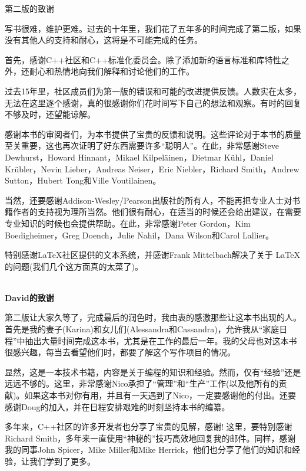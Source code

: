 \begin{flushright}
 第二版的致谢
\end{flushright}

写书很难，维护更难。过去的十年里，我们花了五年多的时间完成了第二版，如果没有其他人的支持和耐心，这将是不可能完成的任务。

首先，感谢C++社区和C++标准化委员会。除了添加新的语言标准和库特性之外，还耐心和热情地向我们解释和讨论他们的工作。

过去15年里，社区成员们为第一版的错误和可能的改进提供反馈。人数实在太多，无法在这里逐个感谢，真的很感谢你们花时间写下自己的想法和观察。有时的回复不够及时，还望能谅解。

感谢本书的审阅者们，为本书提供了宝贵的反馈和说明。这些评论对于本书的质量至关重要，这也再次证明了好东西需要许多“聪明人”。在此，非常感谢Steve Dewhurst，Howard Hinnant，Mikael Kilpel{\"a}inen，Dietmar K{\"u}hl，Daniel Kr{\"u}bler，Nevin Lieber，Andreas Neiser，Eric Niebler，Richard Smith，Andrew Sutton，Hubert Tong和Ville Voutilainen。

当然，还要感谢Addison-Wesley/Pearson出版社的所有人，不能再把专业人士对书籍作者的支持视为理所当然。他们很有耐心，在适当的时候还会给出建议，在需要专业知识的时候也会提供帮助。在此，非常感谢Peter Gordon，Kim Boedigheimer，Greg Doench，Julie Nahil，Dana
Wilson和Carol Lallier。

特别感谢LaTeX社区提供的文本系统，并感谢Frank Mittelbach解决了关于 \LaTeX 的问题(我们几个这方面真的太菜了)。

\hspace*{\fill} \\ %
\noindent\textbf{David的致谢}

第二版让大家久等了，完成最后的润色时，我由衷的感激那些让这本书出现的人。首先是我的妻子(Karina)和女儿们(Alessandra和Cassandra)，允许我从“家庭日程”中抽出大量时间完成这本书，尤其是在工作的最后一年。我的父母也对这本书很感兴趣，每当去看望他们时，都要了解这个写作项目的情况。

显然，这是一本技术书籍，内容是关于编程的知识和经验。然而，仅有“经验”还是远远不够的。这里，非常感谢Nico承担了“管理”和“生产”工作(以及他所有的贡献)。如果这本书对你有用，并且有一天遇到了Nico，一定要感谢他的付出。还要感谢Doug的加入，并在日程安排艰难的时刻坚持本书的编纂。

多年来，C++社区的许多开发者也分享了宝贵的见解，感谢! 这里，要特别感谢Richard Smith，多年来一直使用“神秘的”技巧高效地回复我的邮件。同样，感谢我的同事John Spicer，Mike Miller和Mike Herrick，他们也分享了他们的知识和经验，让我们学到了更多。

